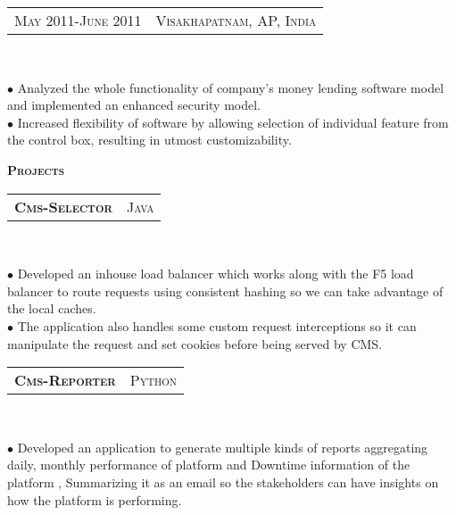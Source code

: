 \documentclass[10pt,a4paper,oneside]{article}
\begin{document}
\begin{minipage}[t]{0.63\textwidth}
        \textcolor{light-gray}{
            \begin{tabular}{c|c}
                {\small M\textsc{ay 2011}-J\textsc{une 2011}}
                 &{\small V\textsc{isakhapatnam}, AP, I\textsc{ndia}}
            \end{tabular}
        }\\ 
        \vspace{-4mm}
        \begin{adjustwidth}{7pt}{0pt}
            {\footnotesize $\bullet$ Analyzed the whole functionality of company's money lending software model and implemented an enhanced security
            model.\\
        $\bullet$ Increased flexibility of software by allowing selection of individual feature from the control box, resulting in utmost
    customizability.}\\
        \end{adjustwidth}
        \textcolor{light-gray}{\textbf{\large P\textsc{rojects}}}
        \vspace{10pt}\\
        \begin{tabular}{c|c}
            \textbf{\normalsize C\textsc{ms}-S\textsc{elector}}
            &\textmd{\normalsize J\textsc{ava}}
        \end{tabular}\\
         \vspace{-4mm}
        \begin{adjustwidth}{7pt}{0pt}
            {\footnotesize $\bullet$  Developed an inhouse load balancer which works along with the F5 load balancer to route requests using consistent hashing so we can take advantage of the local caches.\\ 
            $\bullet$ The application also handles some custom request interceptions so it can manipulate the request and set cookies before being served by CMS.}\\ 
        \end{adjustwidth}
        \begin{tabular}{c|c}
            \textbf{\normalsize C\textsc{ms}-R\textsc{eporter}}
            &\textmd{\normalsize P\textsc{ython}}
        \end{tabular}\\
         \vspace{-4mm}
        \begin{adjustwidth}{7pt}{0pt}
            {\footnotesize $\bullet$ Developed an application to generate multiple kinds of reports aggregating daily, monthly performance of platform and Downtime information of the platform , Summarizing it as an email so the stakeholders can have insights on how the platform is performing.\\ 
}
\end{adjustwidth}
\end{minipage}
\end{document}

